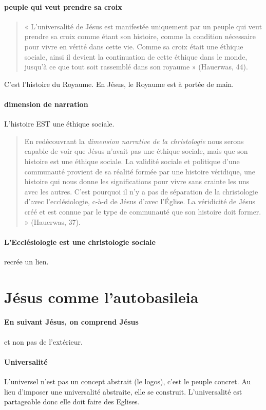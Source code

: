 \paragraph{peuple qui veut prendre sa croix}
\begin{quote}
    « L’universalité de Jésus est manifestée uniquement par un peuple qui veut prendre sa croix comme
étant son histoire, comme la condition nécessaire pour vivre en vérité dans cette vie. Comme sa croix
était une éthique sociale, ainsi il devient la continuation de cette éthique dans le monde, jusqu’à ce que
tout soit rassemblé dans son royaume » (Hauerwas, 44).
\end{quote}
C'est l'histoire du Royaume. En Jésus, le Royaume est à portée de main.


\paragraph{dimension de narration} L'histoire EST une éthique sociale. 
\begin{quote}
    En redécouvrant la \textit{dimension narrative de la christologie} nous serons capable de voir que Jésus
n’avait pas une éthique sociale, mais que son histoire est une éthique sociale. La validité sociale et
politique d’une communauté provient de sa réalité formée par une histoire véridique, une histoire qui
nous donne les significations pour vivre sans crainte les uns avec les autres. C’est pourquoi il n’y a pas
de séparation de la christologie d’avec l’ecclésiologie, c-à-d de Jésus d’avec l’Église. La véridicité de
Jésus créé et est connue par le type de communauté que son histoire doit former. » (Hauerwas, 37).
\end{quote}

\paragraph{L'Ecclésiologie est une christologie sociale} recrée un lien. 
\section{Jésus comme l’autobasileia}

\paragraph{En suivant Jésus, on comprend Jésus} et non pas de l'extérieur.

\paragraph{Universalité}
L'universel n'est pas un concept abstrait (le logos), c'est le peuple concret. 
Au lieu d'imposer une universalité abstraite, elle se construit. L'universalité est partageable donc elle doit faire des Eglises.

